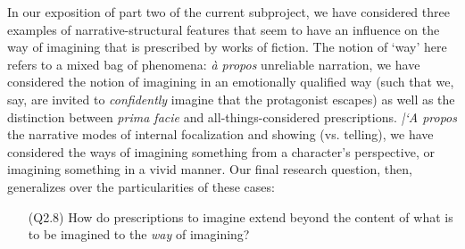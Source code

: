 In our exposition of part two of the current subproject, we have considered three examples of narrative-structural features that seem to have an influence on the way of imagining that is prescribed by works of fiction. The notion of `way' here refers to a mixed bag of phenomena: \emph{\`a propos} unreliable narration, we have considered the notion of imagining in an emotionally qualified way (such that we, say, are invited to \emph{confidently} imagine that the protagonist escapes) as well as the distinction between \emph{prima facie} and all-things-considered prescriptions. \emph{|`A propos} the narrative modes of internal focalization and showing (vs. telling), we have considered the ways of imagining something from a character's perspective, or imagining something in a vivid manner. Our final research question, then, generalizes over the particularities of these cases:

\vspace{-.1cm}
\begin{itemize}[leftmargin=2cm]
\item[(Q2.8)] How do prescriptions to imagine extend beyond the content of what is to be imagined to the  \emph{way} of imagining?
\end{itemize}
\vspace{-.1cm}


